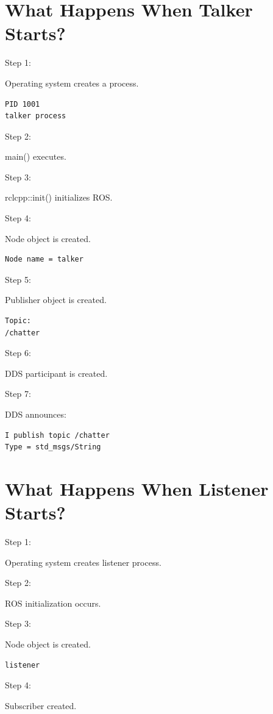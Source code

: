 \documentclass[11pt]{article}
\begin{document}
\section{What Happens When Talker Starts?}

Step 1:

Operating system creates a process.

\begin{verbatim}
PID 1001
talker process
\end{verbatim}

Step 2:

main() executes.

Step 3:

rclcpp::init() initializes ROS.

Step 4:

Node object is created.

\begin{verbatim}
Node name = talker
\end{verbatim}

Step 5:

Publisher object is created.

\begin{verbatim}
Topic:
/chatter
\end{verbatim}

Step 6:

DDS participant is created.

Step 7:

DDS announces:

\begin{verbatim}
I publish topic /chatter
Type = std_msgs/String
\end{verbatim}

\section{What Happens When Listener Starts?}

Step 1:

Operating system creates listener process.

Step 2:

ROS initialization occurs.

Step 3:

Node object is created.

\begin{verbatim}
listener
\end{verbatim}

Step 4:

Subscriber created.
\end{document}
